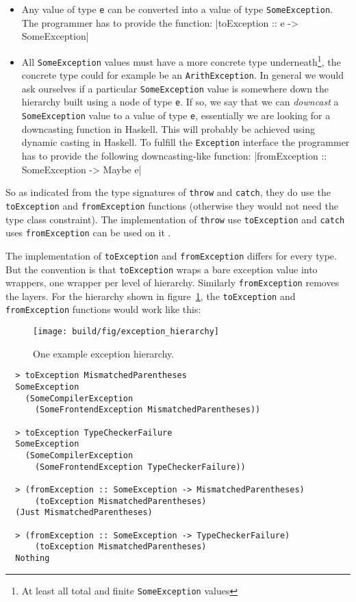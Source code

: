 \begin{itemize}
  \item
    Any value of type \texttt{e} can be converted
    into a value of type \texttt{SomeException}. The programmer has to
    provide the function:
    |toException :: e -> SomeException|
  \item
    All \texttt{SomeException} values must have a more concrete type
    underneath\footnote{At least all total and finite
      \texttt{SomeException} values}, the concrete type could for
    example be an \texttt{ArithException}. In general we
    would ask ourselves if a particular \texttt{SomeException} value is
    somewhere down the hierarchy built using a node of type \texttt{e}.
    If so, we say that we can \emph{downcast} a
    \texttt{SomeException} value to a value of type \texttt{e},
    essentially we are looking for a downcasting function in Haskell.
    This will probably be achieved using dynamic casting in Haskell.
    To fulfill the \texttt{Exception} interface
    the programmer has to provide the following downcasting-like
    function:
    |fromException :: SomeException -> Maybe e|
\end{itemize}

So as indicated from the type signatures of \texttt{throw}
and \texttt{catch}, they do use the \texttt{toException} and
\texttt{fromException} functions (otherwise they would not need the
type class constraint). The implementation of \texttt{throw} use
\texttt{toException} and \texttt{catch} uses \texttt{fromException} can
be used on it \cite{github_catch_uses_SomeException}.

The implementation of \texttt{toException} and \texttt{fromException}
differs for every type. But the convention is that \texttt{toException}
wraps a bare exception value into wrappers, one wrapper per level of
hierarchy. Similarly \texttt{fromException} removes the layers. For the
hierarchy shown in figure~\ref{fig:exception_hierarchy}, the
\texttt{toException} and \texttt{fromException} functions would work
like this:

\begin{figure}
\begin{mdframed}
  \texttt{[image: build/fig/exception\_hierarchy]}
  \caption{One example exception hierarchy.}
  \label{fig:exception_hierarchy}
\end{mdframed}
\end{figure}

\begin{verbatim}
  > toException MismatchedParentheses
  SomeException
    (SomeCompilerException
      (SomeFrontendException MismatchedParentheses))

  > toException TypeCheckerFailure
  SomeException
    (SomeCompilerException
      (SomeFrontendException TypeCheckerFailure))

  > (fromException :: SomeException -> MismatchedParentheses)
      (toException MismatchedParentheses)
  (Just MismatchedParentheses)

  > (fromException :: SomeException -> TypeCheckerFailure)
      (toException MismatchedParentheses)
  Nothing
\end{verbatim}

